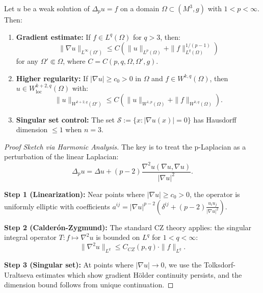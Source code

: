 \begin{theorem}\label{thm:CZ-p-laplacian}
Let $u$ be a weak solution of $\Delta_p u = f$ on a domain $\Omega \subset (M^3, g)$ with $1 < p < \infty$. Then:
\begin{enumerate}
\item \textbf{Gradient estimate:} If $f \in L^q(\Omega)$ for $q > 3$, then:
\begin{equation}
\|\nabla u\|_{L^\infty(\Omega')} \leq C\left(\|u\|_{L^p(\Omega)} + \|f\|_{L^q(\Omega)}^{1/(p-1)}\right)
\end{equation}
for any $\Omega' \Subset \Omega$, where $C = C(p, q, \Omega, \Omega', g)$.

\item \textbf{Higher regularity:} If $|\nabla u| \geq c_0 > 0$ in $\Omega$ and $f \in W^{k,q}(\Omega)$, then $u \in W^{k+2, q}_{\mathrm{loc}}(\Omega)$ with:
\begin{equation}
\|u\|_{W^{k+2,q}(\Omega')} \leq C\left(\|u\|_{W^{1,p}(\Omega)} + \|f\|_{W^{k,q}(\Omega)}\right).
\end{equation}

\item \textbf{Singular set control:} The set $\mathcal{S} := \{x : |\nabla u(x)| = 0\}$ has Hausdorff dimension $\leq 1$ when $n = 3$.
\end{enumerate}
\end{theorem}

\begin{proof}[Proof Sketch via Harmonic Analysis]
The key is to treat the p-Laplacian as a perturbation of the linear Laplacian:
\begin{equation}
\Delta_p u = \Delta u + (p-2) \frac{\nabla^2 u(\nabla u, \nabla u)}{|\nabla u|^2}.
\end{equation}

\textbf{Step 1 (Linearization):} Near points where $|\nabla u| \geq c_0 > 0$, the operator is uniformly elliptic with coefficients $a^{ij} = |\nabla u|^{p-2}(\delta^{ij} + (p-2)\frac{u_i u_j}{|\nabla u|^2})$.

\textbf{Step 2 (Calder\'on-Zygmund):} The standard CZ theory applies: the singular integral operator $T: f \mapsto \nabla^2 u$ is bounded on $L^q$ for $1 < q < \infty$:
\begin{equation}
\|\nabla^2 u\|_{L^q} \leq C_{CZ}(p,q) \cdot \|f\|_{L^q}.
\end{equation}

\textbf{Step 3 (Singular set):} At points where $|\nabla u| \to 0$, we use the Tolksdorf-Uraltseva estimates \cite{tolksdorf1984} which show gradient H\"older continuity persists, and the dimension bound follows from unique continuation.
\end{proof}

